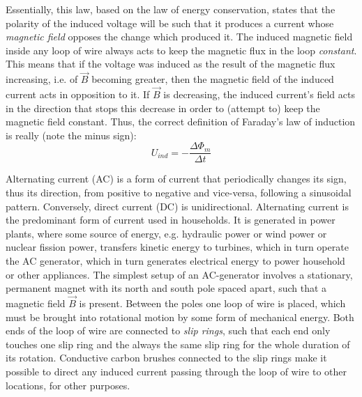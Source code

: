 Essentially, this law, based on the law of energy conservation, states that the polarity of the induced voltage will be such that it produces a current whose \emph{magnetic field} opposes the change which produced it. The induced magnetic field inside any loop of wire always acts to keep the magnetic flux in the loop \emph{constant}. This means that if the voltage was induced as the result of the magnetic flux increasing, i.e. of $\vec{B}$ becoming greater, then the magnetic field of the induced current acts in opposition to it. If $\vec{B}$ is decreasing, the induced current's field acts in the direction that stops this decrease in order to (attempt to) keep the magnetic field constant. Thus, the correct definition of Faraday's law of induction is really (note the minus sign): $$U_{ind} = - \frac{\Delta \Phi_m}{\Delta t}$$

\pagebreak


Alternating current (AC) is a form of current that periodically changes its sign, thus its direction, from positive to negative and vice-versa, following a sinusoidal pattern. Conversely, direct current (DC) is unidirectional. Alternating current is the predominant form of current used in households. It is generated in power plants, where some source of energy, e.g. hydraulic power or wind power or nuclear fission power, transfers kinetic energy to turbines, which in turn operate the AC generator, which in turn generates electrical energy to power household or other appliances. The simplest setup of an AC-generator involves a stationary, permanent magnet with its north and south pole spaced apart, such that a magnetic field $\vec{B}$ is present. Between the poles one loop of wire is placed, which must be brought into rotational motion by some form of mechanical energy. Both ends of the loop of wire are connected to \emph{slip rings}, such that each end only touches one slip ring and the always the same slip ring for the whole duration of its rotation. Conductive carbon brushes connected to the slip rings make it possible to direct any induced current passing through the loop of wire to other locations, for other purposes. 

